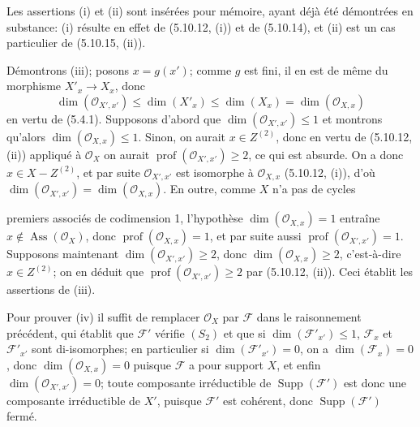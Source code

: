 Les assertions (i) et (ii) sont insérées pour mémoire, ayant déjà été
démontrées en substance: (i) résulte en effet de (5.10.12, (i)) et de
(5.10.14), et (ii) est un cas particulier de (5.10.15, (ii)).

Démontrons (iii); posons $x=g(x')$; comme $g$ est fini, il en est de même du
morphisme $X'_x\to X_x$, donc
\[
\dim(\mathcal O_{X',x'})\leq\dim(X'_x)\leq\dim(X_x)
=\dim(\mathcal O_{X,x})
\]
en vertu de (5.4.1). Supposons d'abord que
$\dim(\mathcal O_{X',x'})\leq1$ et montrons qu'alors
$\dim(\mathcal O_{X,x})\leq1$. Sinon, on aurait $x\in Z^{(2)}$, donc en vertu
de (5.10.12, (ii)) appliqué à $\mathcal O_X$ on aurait
$\operatorname{prof}(\mathcal O_{X',x'})\geq2$, ce qui est absurde. On a donc
$x\in X-Z^{(2)}$, et par suite $\mathcal O_{X',x'}$ est isomorphe à
$\mathcal O_{X,x}$ (5.10.12, (i)), d'où
$\dim(\mathcal O_{X',x'})=\dim(\mathcal O_{X,x})$. En outre, comme $X$ n'a
pas de cycles


premiers associés de codimension 1, l'hypothèse
$\dim(\mathcal O_{X,x})=1$ entraîne $x\notin\operatorname{Ass}(\mathcal O_X)$,
donc $\operatorname{prof}(\mathcal O_{X,x})=1$, et par suite aussi
$\operatorname{prof}(\mathcal O_{X',x'})=1$. Supposons maintenant
$\dim(\mathcal O_{X',x'})\geq2$, donc $\dim(\mathcal O_{X,x})\geq2$,
c'est-à-dire $x\in Z^{(2)}$; on en déduit que
$\operatorname{prof}(\mathcal O_{X',x'})\geq2$ par (5.10.12, (ii)). Ceci
établit les assertions de (iii).

Pour prouver (iv) il suffit de remplacer $\mathcal O_X$ par $\mathcal F$ dans
le raisonnement précédent, qui établit que $\mathcal F'$ vérifie $(S_2)$ et
que si $\dim(\mathcal F'_{x'})\leq1$, $\mathcal F_x$ et
$\mathcal F'_{x'}$ sont di-isomorphes; en particulier si
$\dim(\mathcal F'_{x'})=0$, on a $\dim(\mathcal F_x)=0$, donc
$\dim(\mathcal O_{X,x})=0$ puisque $\mathcal F$ a pour support $X$, et enfin
$\dim(\mathcal O_{X',x'})=0$; toute composante irréductible de
$\operatorname{Supp}(\mathcal F')$ est donc une composante irréductible de
$X'$, puisque $\mathcal F'$ est cohérent, donc
$\operatorname{Supp}(\mathcal F')$ fermé.


